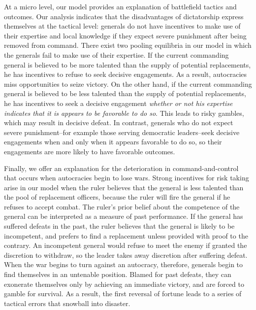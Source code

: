 \documentclass[11pt,]{article}
\begin{document}

At a micro level, our model provides an explanation of battlefield tactics and outcomes.  Our analysis indicates that the disadvantages of dictatorship express themselves at the tactical level:  generals do not have incentives to make use of their expertise and local knowledge if they expect severe punishment after being removed from command. There exist two pooling equilibria in our model in which the generals fail to make use of their expertise.  If the current commanding general is believed to be more talented than the supply of potential replacements,  he has incentives to refuse to seek decisive engagements.  As a result, autocracies miss opportunities to seize victory.  On the other hand, if the current commanding general is believed to be less talented than the supply of potential replacements, he has incentives to seek a decisive engagement \textit{whether or not his expertise indicates that it is appears to be favorable to do so}.  This leads to risky gambles, which may result in decisive defeat. In contrast, generals who do not expect severe punishment--for example those serving democratic leaders--seek decisive engagements when and only when it appears favorable to do so, so their engagements are more likely to have favorable outcomes.  

Finally, we offer an explanation for the deterioration in command-and-control that occurs when autocracies begin to lose wars.  Strong incentives for risk taking arise in our model when the ruler believes that the general is less talented than the pool of replacement officers, because the ruler will fire the general if he refuses to accept combat.  The ruler's prior belief about the competence of the general can be interpreted as a measure of past performance.  If the general has suffered defeats in the past, the ruler believes that the general is likely to be incompetent, and prefers to find a replacement unless provided with proof to the contrary.  An incompetent general would refuse to meet the enemy if granted the discretion to withdraw, so the leader takes away discretion after suffering defeat. When the war begins to turn against an autocracy, therefore, generals begin to find themselves in an untenable position.  Blamed for past defeats, they can exonerate themselves only by achieving an immediate victory, and are forced to gamble for survival.  As a result, the first reversal of fortune leads to a series of tactical errors that snowball into disaster.  
\end{document}
